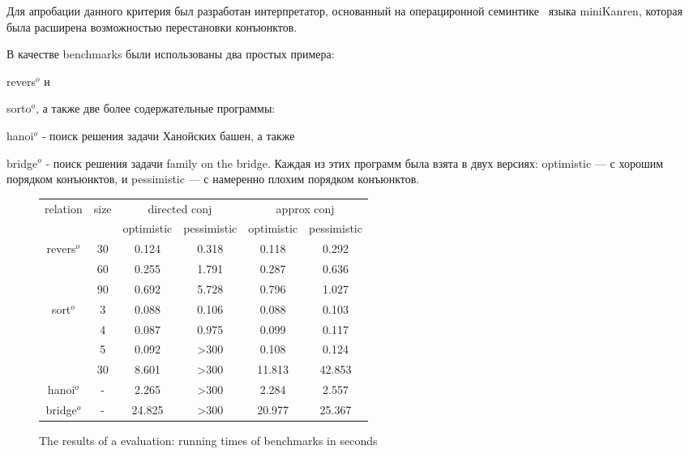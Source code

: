 \documentclass[submission,copyright,creativecommons]{eptcs}
\newcommand*{\SavedLstInline}{}
\DeclareRobustCommand*{\lstinline}{%
  \ifmmode
    \let\SavedBGroup\bgroup
    \def\bgroup{%
      \let\bgroup\SavedBGroup
      \hbox\bgroup
    }%
  \fi
  \SavedLstInline
}
\begin{document}
Для апробации данного критерия был разработан интерпретатор, основанный на операциронной семинтике~\cite{CertifiedSemantics} языка miniKanren, которая была расширена возможностью перестановки конъюнктов.

В качестве benchmarks были использованы два простых примера: \lstinline{revers$^o$} и \lstinline{sorto$^o$}, а также две более содержательные программы: \lstinline{hanoi$^o$} - поиск решения задачи Ханойских башен, а также \lstinline{bridge$^o$} - поиск решения задачи family on the bridge. Каждая из этих программ была взята в двух версиях: optimistic --- с хорошим порядком конъюнктов, и pessimistic --- с намеренно плохим порядком конъюнктов.

\begin{figure}[h]
  \small
  \centering
  \begin{tabular}{ c | c | c | c | c | c }
    relation & size &  \multicolumn{2}{c}{directed conj} & \multicolumn{2}{c}{approx conj} \\
    \cline{3-6}
    & & optimistic & pessimistic & optimistic & pessimistic  \\ 
    \hline
    revers$^o$   & 30         & 0.124 & 0.318 & 0.118 & 0.292 \\
                 & 60         & 0.255 & 1.791 & 0.287 & 0.636 \\
                 & 90         & 0.692 & 5.728 & 0.796 & 1.027 \\
    \hline
    sort$^o$     & 3          & 0.088 & 0.106 & 0.088  & 0.103  \\
                 & 4          & 0.087 & 0.975 & 0.099  & 0.117  \\
                 & 5          & 0.092 & >300  & 0.108  & 0.124  \\
                 & 30         & 8.601 & >300  & 11.813 & 42.853 \\ 
    \hline
    hanoi$^o$    & -          & 2.265 & >300  & 2.284 & 2.557  \\
    \hline
    bridge$^o$   & -          & 24.825 & >300 & 20.977 & 25.367    

  \end{tabular}
  \caption{The results of a evaluation: running times of benchmarks in seconds}
  \label{evaluation_results}
\end{figure}



\end{document}
